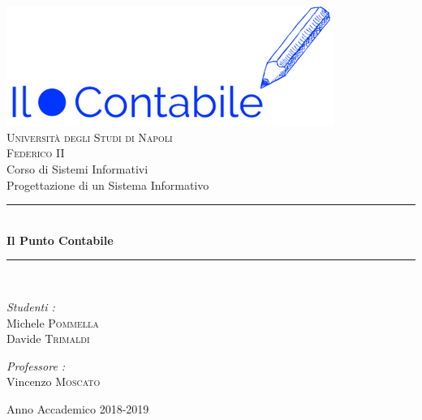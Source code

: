 \documentclass[a4paper]{report}
\begin{document}
	
	
	\begin{titlepage}
		\begin{center}
			
			\includegraphics[width=0.8\textwidth]{contabile}\\[1cm]
			
			{\LARGE  \textsc{Università degli Studi di Napoli}}\\[0.5cm]
			
			{\LARGE  \textsc{Federico II}}\\[0.5cm]
			
			{\Large Corso di Sistemi Informativi}\\[0.5cm]
			
			{\large Progettazione di un Sistema Informativo}\\[0.5cm]
			
			\rule{\linewidth}{0.5mm} \\[0.4cm]
			{ \huge \bfseries Il Punto Contabile \\[0.4cm] }
			\rule{\linewidth}{0.5mm} \\[1.5cm]
			
			\noindent
			\begin{minipage}{0.4\textwidth}
				\begin{flushleft} \large
					\emph{Studenti :}\\
					Michele \textsc{Pommella}\\
					Davide \textsc{Trimaldi}
				\end{flushleft}
			\end{minipage}%
			\begin{minipage}{0.4\textwidth}
				\begin{flushright} \large
					\emph{Professore :} \\
					Vincenzo \textsc{Moscato}
				\end{flushright}
			\end{minipage}
			
			\vfill
			
			{\large Anno Accademico 2018-2019}
			
		\end{center}
	\end{titlepage}
	
	
	
	\tableofcontents
	\listoffigures
	\listoftables
	
	
	
	
	
	
	
\end{document}
